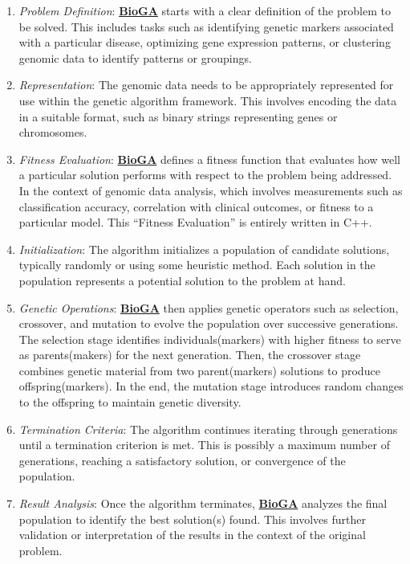 \documentclass[
]{article}
\providecommand{\tightlist}{%
  \setlength{\itemsep}{0pt}\setlength{\parskip}{0pt}}
\begin{document}
\begin{enumerate}
\def\labelenumi{\arabic{enumi}.}
\tightlist
\item
  \emph{Problem Definition}:
  \href{https://doi.org/doi:10.18129/B9.bioc.BioGA}{\textbf{BioGA}}
  starts with a clear definition of the problem to be solved. This
  includes tasks such as identifying genetic markers associated with a
  particular disease, optimizing gene expression patterns, or clustering
  genomic data to identify patterns or groupings.
\item
  \emph{Representation}: The genomic data needs to be appropriately
  represented for use within the genetic algorithm framework. This
  involves encoding the data in a suitable format, such as binary
  strings representing genes or chromosomes.
\item
  \emph{Fitness Evaluation}:
  \href{https://doi.org/doi:10.18129/B9.bioc.BioGA}{\textbf{BioGA}}
  defines a fitness function that evaluates how well a particular
  solution performs with respect to the problem being addressed. In the
  context of genomic data analysis, which involves measurements such as
  classification accuracy, correlation with clinical outcomes, or
  fitness to a particular model. This ``Fitness Evaluation'' is entirely
  written in C++.
\item
  \emph{Initialization}: The algorithm initializes a population of
  candidate solutions, typically randomly or using some heuristic
  method. Each solution in the population represents a potential
  solution to the problem at hand.
\item
  \emph{Genetic Operations}:
  \href{https://doi.org/doi:10.18129/B9.bioc.BioGA}{\textbf{BioGA}} then
  applies genetic operators such as selection, crossover, and mutation
  to evolve the population over successive generations. The selection
  stage identifies individuals(markers) with higher fitness to serve as
  parents(makers) for the next generation. Then, the crossover stage
  combines genetic material from two parent(markers) solutions to
  produce offspring(markers). In the end, the mutation stage introduces
  random changes to the offspring to maintain genetic diversity.
\item
  \emph{Termination Criteria}: The algorithm continues iterating through
  generations until a termination criterion is met. This is possibly a
  maximum number of generations, reaching a satisfactory solution, or
  convergence of the population.
\item
  \emph{Result Analysis}: Once the algorithm terminates,
  \href{https://doi.org/doi:10.18129/B9.bioc.BioGA}{\textbf{BioGA}}
  analyzes the final population to identify the best solution(s) found.
  This involves further validation or interpretation of the results in
  the context of the original problem.
\end{enumerate}
\end{document}
